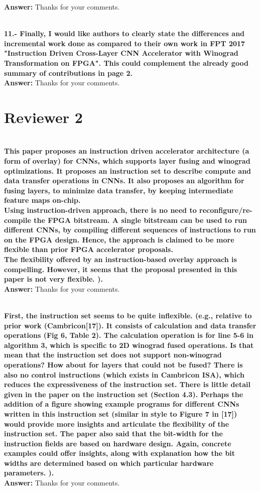 \documentclass[12pt]{paper}
\newcommand{\rev}[1]{{{\color[rgb]{0,0,1}{#1}}}}
\newcommand{\reviewer}[1]{\section*{Reviewer #1}}
\newcommand{\answer}[1]{\noindent\textbf{Answer:} #1}
\newcommand{\comment}[1]{\noindent\textbf{\\ #1}\\}
\begin{document}
\answer{Thanks for your comments.}
\rev{We have corrected this error.}

\comment{11.- Finally, I would like authors to clearly state the differences and incremental work done as compared to their own work in FPT 2017 "Instruction Driven Cross-Layer CNN Accelerator with Winograd Transformation on FPGA". This could complement the already good summary of contributions in page 2.}
\answer{Thanks for your comments.}
\rev{We have corrected this error.}

\reviewer{2}

\comment{This paper proposes an instruction driven accelerator architecture (a form of overlay) for CNNs, which supports layer fusing and winograd optimizations. It proposes an instruction set to describe compute and data transfer operations in CNNs. It also proposes an algorithm for fusing layers, to minimize data transfer, by keeping intermediate feature maps on-chip.\\ 
Using instruction-driven approach, there is no need to reconfigure/re-compile the FPGA bitstream. A single bitstream can be used to run different CNNs, by compiling different sequences of instructions to run on the FPGA design. Hence, the approach is claimed to be more flexible than prior FPGA accelerator proposals. \\
The flexibility offered by an instruction-based overlay approach is compelling. However, it seems that the proposal presented in this paper is not very flexible. ). 
}
\answer{Thanks for your comments.}
\rev{We have corrected this error.}

\comment{First, the instruction set seems to be quite inflexible. (e.g., relative to prior work (Cambricon[17]). It consists of calculation and data transfer operations (Fig 6, Table 2). The calculation operation is for line 5-6 in algorithm 3, which is specific to 2D winograd fused operations. Is that mean that the instruction set does not support non-winograd operations? How about for layers that could not be fused? There is also no control instructions (which exists in Cambricon ISA), which reduces the expressiveness of the instruction set. There is little detail given in the paper on the instruction set (Section 4.3). Perhaps the addition of a figure showing example programs for different CNNs written in this instruction set (similar in style to Figure 7 in [17]) would provide more insights and articulate the flexibility of the instruction set. The paper also said that the bit-width for the instruction fields are based on hardware design. Again, concrete examples could offer insights, along with explanation how the bit widths are determined based on which particular hardware parameters. ). 
}
\answer{Thanks for your comments.}
\rev{We have corrected this error.}
\end{document}
